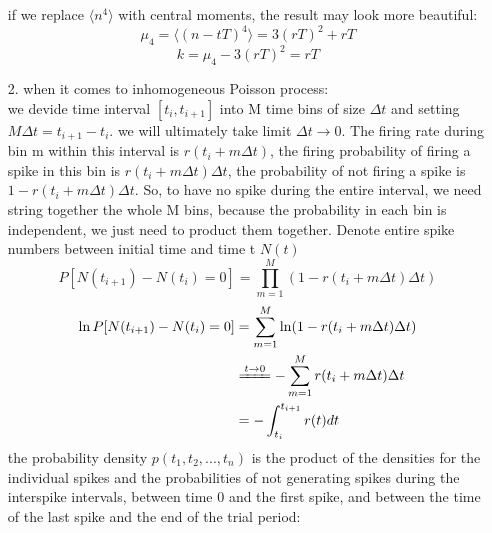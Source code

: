 \documentclass{article}
\begin{document}
\begin{enumerate}
\begin{equation}
          \end{equation}
          if we replace $\langle n^4 \rangle $ with central moments, the result may look more beautiful:
          \begin{equation}
              \mu_4 = \langle (n-tT)^4 \rangle = 3(rT)^2+rT
          \end{equation}
          \begin{equation}
              k = \mu_4 - 3(rT)^2 = rT
          \end{equation}
    \item[2.]when it comes to inhomogeneous Poisson process:\\
          we devide time interval $[t_i,t_{i+1}]$ into M time bins of size $\Delta t$ and setting $M\Delta t = t_{i+1}-t_i$.
          we will ultimately take limit $\Delta t \rightarrow 0$. The firing rate during bin m within this interval is $r(t_i+m\Delta t)$,
          the firing probability of firing a spike in this bin is $r(t_i+m\Delta t)\Delta t$, the probability of not firing a spike is
          $1-r(t_i+m\Delta t)\Delta t$. So, to have no spike during the entire interval, we need string together the whole M bins,
          because the probability in each bin is independent, we just need to product them together.
          Denote entire spike numbers between initial time and time t $N(t)$
          \begin{equation}
              P[N(t_{i+1})-N(t_i) = 0] = \prod_{m=1}^M(1-r(t_i+m\Delta t)\Delta t)
          \end{equation}
          \begin{equation}
              \begin{split}
                  \ln P[N(t_{i+1})-N(t_i) = 0] &= \sum_{m=1}^M\ln(1-r(t_i+m\Delta t)\Delta t)\\
                  &\xlongequal{t\rightarrow 0}-\sum_{m = 1}^Mr(t_i+m\Delta t)\Delta t\\
                  &=-\int^{t_{i+1}}_{t_{i}}r(t)dt
              \end{split}
          \end{equation}
          the probability density $p(t_1,t_2,...,t_n)$ is the product of the densities for the individual
          spikes and the probabilities of not generating spikes during the interspike intervals,
          between time 0 and the first spike, and between the time of the last spike and the end of the trial period:
          \begin{equation}
              \begin{split}

\end{split}
\end{equation}
\end{enumerate}
\end{document}
